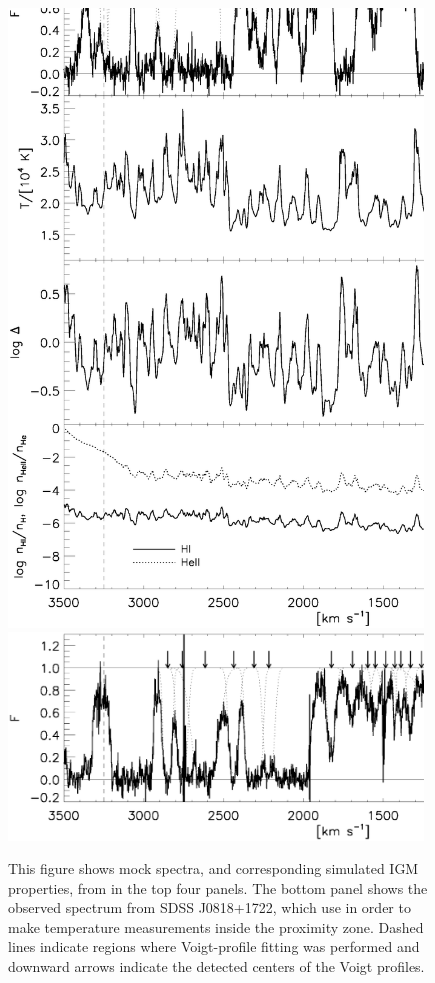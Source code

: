 \begin{figure}[!p]
  \centering
  \includegraphics[width=11cm]{BoltonIGMTemperature_Fig2.ps}
  \includegraphics[width=11cm]{BoltonIGMTemperature_Fig2b.ps}
  \caption{This figure shows mock spectra, and corresponding simulated IGM properties, from \cite{BoltonQuasar} in the top four panels. The bottom panel shows the observed spectrum from SDSS J0818+1722, which \cite{BoltonQuasar} use in order to make temperature measurements inside the proximity zone. Dashed lines indicate regions where Voigt-profile fitting was performed and downward arrows indicate the detected centers of the Voigt profiles.}
  \label{fig:QuasarProximityTemp}
\end{figure}

